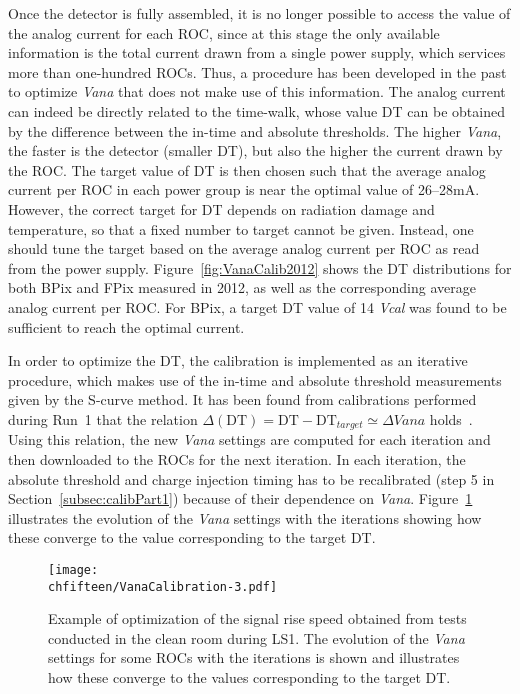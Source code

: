 Once the detector is fully assembled, it is no longer possible to access the value of the analog current for each ROC, since at this stage the only available information is the total current drawn from a single power supply, which services more than one-hundred ROCs. Thus, a procedure has been developed in the past to optimize \textit{Vana} that does not make use of this information.
The analog current can indeed be directly related to the time-walk, whose value DT can be obtained by the difference between the in-time and absolute thresholds.
The higher \textit{Vana}, the faster is the detector (smaller DT), but also the higher the current drawn by the ROC.
The target value of DT is then chosen such that the average analog current per ROC in each power group is near the optimal value of 26--28\unit{mA}.
However, the correct target for DT depends on radiation damage and temperature, so that a fixed number to target cannot be given.
Instead, one should tune the target based on the average analog current per ROC as read from the power supply.
Figure~\ref{fig:VanaCalib2012} shows the DT distributions for both BPix and FPix measured in 2012, as well as the corresponding average analog current per ROC.
For BPix, a target DT value of 14 \textit{Vcal} was found to be sufficient to reach the optimal current.

In order to optimize the DT, the calibration is implemented as an iterative procedure, which makes use of the in-time and absolute threshold measurements given by the S-curve method.
It has been found from calibrations performed during Run~1 that the relation $\Delta(\mathrm{DT}) = \mathrm{DT} - \mathrm{DT}_{target} \simeq \Delta{Vana}$ holds~\cite{Gaz:2013pja}.
Using this relation, the new \textit{Vana} settings are computed for each iteration and then downloaded to the ROCs for the next iteration. In each iteration, the absolute threshold and charge injection timing has to be recalibrated (step 5 in Section~\ref{subsec:calibPart1}) because of their dependence on \textit{Vana}. 
Figure~\ref{fig:VanaCalib} illustrates the evolution of the \textit{Vana} settings with the iterations showing how these converge to the value corresponding to the target DT.

\begin{figure}[!htb]
\begin{center}
 \texttt{[image: \\chfifteen/VanaCalibration-3.pdf]}
 \end{center}
 \caption{Example of optimization of the signal rise speed obtained from tests conducted in the clean room during LS1. The evolution of the \textit{Vana} settings for some ROCs with the iterations is shown and illustrates how these converge to the values corresponding to the target DT. }
 \label{fig:VanaCalib}
\end{figure}

